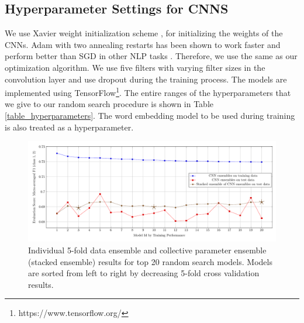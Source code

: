 \documentclass[conference]{IEEEtran}
\begin{document}
\subsection{Hyperparameter Settings for CNNS}
We use Xavier weight initialization scheme \cite{glorot2010understanding}, for initializing the weights of the CNNs. Adam \cite{kingma2014adam} with two annealing restarts has been shown to work faster and perform better than SGD in other NLP tasks \cite{denkowski2017stronger}. Therefore, we use the same as our optimization algorithm. We use five filters with varying filter sizes in the convolution layer and use dropout during the training process. The models are implemented using TensorFlow\footnote{https://www.tensorflow.org/}. The entire ranges of the hyperparameters that we give to our random search procedure is shown in Table \ref{table_hyperparameters}. The word embedding model to be used during training is also treated as a hyperparameter.

\begin{figure}[htbp]
	\centering
	\includegraphics[scale=0.65]{ensemble_plot.pdf}
	\caption{Individual 5-fold data ensemble and collective parameter ensemble (stacked ensemble) results for top 20 random search models. Models are sorted from left to right by decreasing 5-fold cross validation results. }
	\label{plot_ensemble_eval}
\end{figure}
\end{document}
